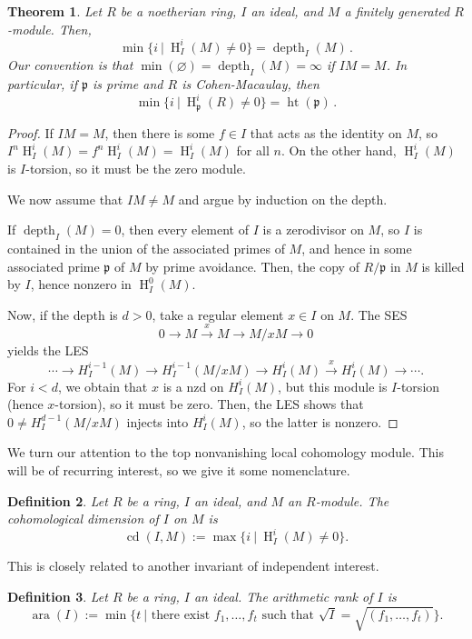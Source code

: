 \documentclass[11pt]{book}
\newtheorem{theorem}{Theorem}[chapter]
\newtheorem{definition}[theorem]{Definition}
\numberwithin{equation}{section}
\numberwithin{theorem}{chapter}
\theoremstyle{definition}
\newtheorem*{basic properties}{Basic Properties}
\newtheorem*{Important Remark}{Important Remark}
\theoremstyle{remark}
\newcommand{\p}{\mathfrak{p}}
\newcommand{\ara}{\operatorname{ara}}
\newcommand{\height}{\operatorname{ht}}
\DeclareMathOperator{\cd}{cd}
\newcommand{\depth}{\operatorname{depth}}
\renewcommand{\height}{\operatorname{ht}}
\renewcommand{\H}{\operatorname{H}}
\begin{document}
\begin{theorem}
	Let $R$ be a noetherian ring, $I$ an ideal, and $M$ a finitely generated $R$-module. Then,
	\[ \min\{ i \ | \ \H^i_I(M)\neq 0 \} = \depth_I(M)\,. \]
	Our convention is that $\min(\varnothing) =\depth_I(M)=\infty$ if $IM=M$.
	In particular, if $\p$ is prime and $R$ is Cohen-Macaulay, then 
	\[ \min\{ i \ | \ \H^i_\p(R)\neq 0 \} = \height(\p)\,. \]
\end{theorem}
\begin{proof}
	If $IM=M$, then there is some $f\in I$ that acts as the identity on $M$, so $I^n \H^i_I(M) = f^n \H^i_I(M) = \H^i_I(M)$ for all $n$. On the other hand, $\H^i_I(M)$ is $I$-torsion, so it must be the zero module.
	
	We now assume that $IM\neq M$ and argue by induction on the depth.
	
	If $\depth_I(M)=0$, then every element of $I$ is a zerodivisor on $M$, so $I$ is contained in the union of the associated primes of $M$, and hence in some associated prime $\p$ of $M$ by prime avoidance. Then, the copy of $R/\p$ in $M$ is killed by $I$, hence nonzero in $\H^0_{I}(M)$.
	
	Now, if the depth is $d>0$, take a regular element $x\in I$ on $M$. The SES
	\[0 \to M \stackrel{x}{\longrightarrow} M \to M/xM \to 0\]
	yields the LES
	\[ \cdots \to H^{i-1}_I(M) \to H^{i-1}_I(M/xM) \to H^{i}_I(M) \stackrel{x}{\longrightarrow} H^{i}_I(M) \to \cdots. \]
	For $i<d$, we obtain that $x$ is a nzd on $H^{i}_I(M)$, but this module is $I$-torsion (hence $x$-torsion), so it must be zero.
	Then, the LES shows that $0\neq H^{d-1}_I(M/xM)$ injects into $H^{i}_I(M)$, so the latter is nonzero.
\end{proof}

We turn our attention to the top nonvanishing local cohomology module. This will be of recurring interest, so we give it some nomenclature.

\begin{definition} Let $R$ be a ring, $I$ an ideal, and $M$ an $R$-module. The \emph{cohomological dimension}\index{$\cd(I,M)$} of $I$ on $M$ is
	\[ \cd(I,M):=\max\{ i \ | \ \H^i_I(M)\neq 0 \}. \]
\end{definition}

This is closely related to another invariant of independent interest.

\begin{definition} Let $R$ be a ring, $I$ an ideal. The \emph{arithmetic rank}\index{$\ara(I)$} of $I$ is
	\[\ara(I):= \min\{ t \ | \text{ there exist } f_1,\dots,f_t \text{ such that } \sqrt{I}=\sqrt{(f_1,\dots,f_t)} \}. \]
\end{definition}
\end{document}
